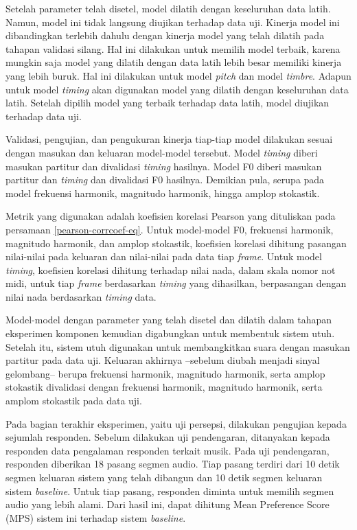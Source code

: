 Setelah parameter telah disetel, model dilatih dengan keseluruhan data latih. Namun, model ini tidak langsung diujikan terhadap data uji. Kinerja model ini dibandingkan terlebih dahulu dengan kinerja model yang telah dilatih pada tahapan validasi silang. Hal ini dilakukan untuk memilih model terbaik, karena mungkin saja model yang dilatih dengan data latih lebih besar memiliki kinerja yang lebih buruk. Hal ini dilakukan untuk model \textit{pitch} dan model \textit{timbre}. Adapun untuk model \textit{timing} akan digunakan model yang dilatih dengan keseluruhan data latih. Setelah dipilih model yang terbaik terhadap data latih, model diujikan terhadap data uji.

Validasi, pengujian, dan pengukuran kinerja tiap-tiap model dilakukan sesuai dengan masukan dan keluaran model-model tersebut. Model \textit{timing} diberi masukan partitur dan divalidasi \textit{timing} hasilnya. Model F0 diberi masukan partitur dan \textit{timing} dan divalidasi F0 hasilnya. Demikian pula, serupa pada model frekuensi harmonik, magnitudo harmonik, hingga amplop stokastik.

Metrik yang digunakan adalah koefisien korelasi Pearson yang dituliskan pada persamaan \ref{pearson-corrcoef-eq}. Untuk model-model F0, frekuensi harmonik, magnitudo harmonik, dan amplop stokastik, koefisien korelasi dihitung pasangan nilai-nilai pada keluaran dan nilai-nilai pada data tiap \textit{frame}. Untuk model \textit{timing}, koefisien korelasi dihitung terhadap nilai nada, dalam skala nomor not midi, untuk tiap \textit{frame} berdasarkan \textit{timing} yang dihasilkan, berpasangan dengan nilai nada berdasarkan \textit{timing} data.

Model-model dengan parameter yang telah disetel dan dilatih dalam tahapan eksperimen komponen kemudian digabungkan untuk membentuk sistem utuh. Setelah itu, sistem utuh digunakan untuk membangkitkan suara dengan masukan partitur pada data uji. Keluaran akhirnya --sebelum diubah menjadi sinyal gelombang-- berupa frekuensi harmonik, magnitudo harmonik, serta amplop stokastik divalidasi dengan frekuensi harmonik, magnitudo harmonik, serta amplom stokastik pada data uji.

Pada bagian terakhir eksperimen, yaitu uji persepsi, dilakukan pengujian kepada sejumlah responden. Sebelum dilakukan uji pendengaran, ditanyakan kepada responden data pengalaman responden terkait musik. Pada uji pendengaran, responden diberikan 18 pasang segmen audio. Tiap pasang terdiri dari 10 detik segmen keluaran sistem yang telah dibangun dan 10 detik segmen keluaran sistem \textit{baseline}. Untuk tiap pasang, responden diminta untuk memilih segmen audio yang lebih alami. Dari hasil ini, dapat dihitung Mean Preference Score (MPS) sistem ini terhadap sistem \textit{baseline}.

